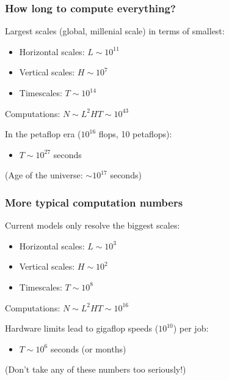 \documentclass{beamer}
\begin{document}
\begin{frame}
    \frametitle{How long to compute everything?}
    
    Largest scales (global, millenial scale) in terms of smallest:
    \begin{itemize}
        \item Horizontal scales: $L \sim 10^{11}$
        \item Vertical scales: $H \sim 10^7$
        \item Timescales: $T \sim 10^{14}$
    \end{itemize}
    Computations: $N \sim L^2 H T \sim 10^{43}$
    
    \vspace{10pt}
    
    In the petaflop era ($10^{16}$ flops, 10 petaflops):
    \begin{itemize}
        \item $T \sim 10^{27}$ seconds
    \end{itemize}
    (Age of the universe: $\sim 10^{17}$ seconds)
\end{frame}

\begin{frame}
    \frametitle{More typical computation numbers}
    
    Current models only resolve the biggest scales:
    \begin{itemize}
        \item Horizontal scales: $L \sim 10^3$
        \item Vertical scales: $H \sim 10^2$
        \item Timescales: $T \sim 10^{8}$
    \end{itemize}
    Computations: $N \sim L^2 H T \sim 10^{16}$
    
    \vspace{10pt}
    
    Hardware limits lead to gigaflop speeds ($10^{10}$) per job:
    \begin{itemize}
        \item $T \sim 10^{6}$ seconds (or months)
    \end{itemize}
    (Don't take any of these numbers too seriously!)
\end{frame}
\end{document}
